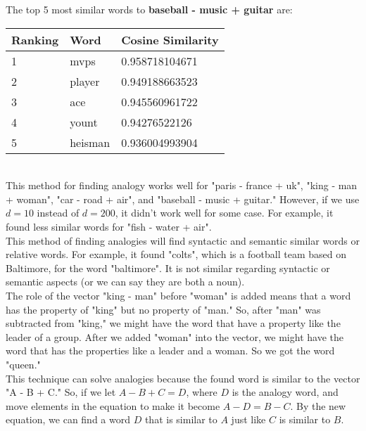 \documentclass{article}
\begin{document}
The top 5 most similar words to \textbf{baseball - music + guitar} are:\\
\begin{tabular}{ p{2.5cm}|p{2.5cm}|p{3cm}  }
 \hline
 Ranking & Word & Cosine Similarity\\
 \hline
1 & mvps & 0.958718104671\\
2 & player & 0.949188663523\\
3 & ace & 0.945560961722\\
4 & yount & 0.94276522126\\
5 & heisman & 0.936004993904\\
 \hline
\end{tabular}\\


\noindent
This method for finding analogy works well for "paris - france + uk", "king - man + woman", "car - road + air", and "baseball - music + guitar." However, if we use $d = 10$ instead of $d = 200$, it didn't work well for some case. For example, it found less similar words for "fish - water + air".\\

\noindent
This method of finding analogies will find syntactic and semantic similar words or relative words. For example, it found "colts", which is a football team based on Baltimore, for the word "baltimore". It is not similar regarding syntactic or semantic aspects (or we can say they are both a noun).\\

\noindent
The role of the vector "king - man" before "woman" is added means that a word has the property of "king" but no property of "man." So, after "man" was subtracted from "king," we might have the word that have a property like the leader of a group. After we added "woman" into the vector, we might have the word that has the properties like a leader and a woman. So we got the word "queen."\\ 

\noindent
This technique can solve analogies because the found word is similar to the vector "A - B + C." So, if we let $A - B + C = D$, where $D$ is the analogy word, and move elements in the equation to make it become $A - D = B - C$. By the new equation, we can find a word $D$ that is similar to $A$ just like $C$ is similar to $B$.\\
\end{document}
